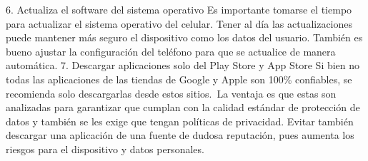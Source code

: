 \documentclass{article}%
\begin{document}
%
6. Actualiza el software del sistema operativo%
\newline%
%
Es importante tomarse el tiempo para actualizar el sistema operativo del celular. Tener al día las actualizaciones puede mantener más seguro el dispositivo como los datos del usuario.%
\newline%
%
También es bueno ajustar la configuración del teléfono para que se actualice de manera automática.%
\newline%
%
7. Descargar aplicaciones solo del Play Store y App Store%
\newline%
%
Si bien no todas las aplicaciones de las tiendas de Google y Apple son 100\% confiables, se recomienda solo descargarlas desde estos sitios.~La ventaja es que estas son analizadas para garantizar que cumplan con la calidad estándar de protección de datos y también se les exige que tengan políticas de privacidad.%
\newline%
%
Evitar también descargar una aplicación de una fuente de dudosa reputación, pues aumenta los riesgos para el dispositivo y datos personales.%
\newline%
%
\end{document}
